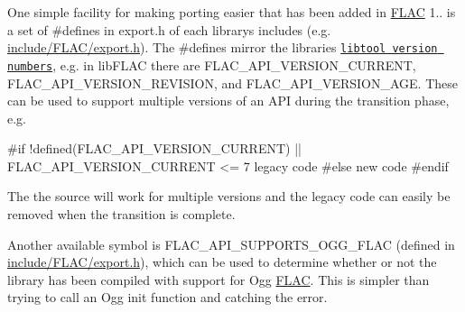 One simple facility for making porting easier that has been added in \hyperlink{namespace_f_l_a_c}{F\+L\+AC} 1.. is a set of {\ttfamily \#defines} in {\ttfamily export.\+h} of each library\textquotesingle{}s includes (e.\+g. {\ttfamily \hyperlink{lib-src_2libflac_2include_2_f_l_a_c_2export_8h}{include/\+F\+L\+A\+C/export.\+h}}). The {\ttfamily \#defines} mirror the libraries\textquotesingle{} \href{http://www.gnu.org/software/libtool/manual/libtool.html#Libtool-versioning}{\tt libtool version numbers}, e.\+g. in lib\+F\+L\+AC there are {\ttfamily F\+L\+A\+C\+\_\+\+A\+P\+I\+\_\+\+V\+E\+R\+S\+I\+O\+N\+\_\+\+C\+U\+R\+R\+E\+NT}, {\ttfamily F\+L\+A\+C\+\_\+\+A\+P\+I\+\_\+\+V\+E\+R\+S\+I\+O\+N\+\_\+\+R\+E\+V\+I\+S\+I\+ON}, and {\ttfamily F\+L\+A\+C\+\_\+\+A\+P\+I\+\_\+\+V\+E\+R\+S\+I\+O\+N\+\_\+\+A\+GE}. These can be used to support multiple versions of an A\+PI during the transition phase, e.\+g.


\begin{DoxyCode}
\textcolor{preprocessor}{#if !defined(FLAC\_API\_VERSION\_CURRENT) || FLAC\_API\_VERSION\_CURRENT <= 7}
  legacy code
\textcolor{preprocessor}{#else}
  \textcolor{keyword}{new} code
\textcolor{preprocessor}{#endif}
\end{DoxyCode}


The the source will work for multiple versions and the legacy code can easily be removed when the transition is complete.

Another available symbol is F\+L\+A\+C\+\_\+\+A\+P\+I\+\_\+\+S\+U\+P\+P\+O\+R\+T\+S\+\_\+\+O\+G\+G\+\_\+\+F\+L\+AC (defined in \hyperlink{lib-src_2libflac_2include_2_f_l_a_c_2export_8h}{include/\+F\+L\+A\+C/export.\+h}), which can be used to determine whether or not the library has been compiled with support for Ogg \hyperlink{namespace_f_l_a_c}{F\+L\+AC}. This is simpler than trying to call an Ogg init function and catching the error. 